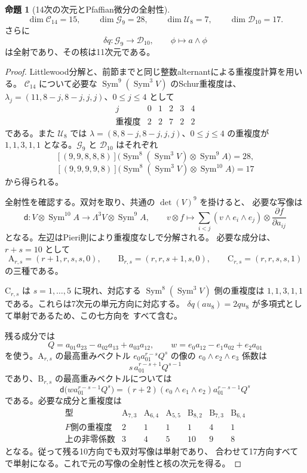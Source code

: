 \documentclass[a4paper,11pt]{ltjsarticle}
\theoremstyle{definition}
\newtheorem{proposition}[theorem]{命題}
\begin{document}
\begin{proposition}[14次の次元とPfaffian微分の全射性]
\label{prop:v11-fourteenth-characters}
\[
 \dim\mathcal C_{14}=15,\qquad
 \dim\mathcal G_9=28,\qquad
 \dim\mathcal U_8=7,\qquad
 \dim\mathcal D_{10}=17.
\]
さらに
\[
 \delta q:\mathcal G_9\longrightarrow\mathcal D_{10},
 \qquad \phi\longmapsto a\wedge\phi
\]
は全射であり、その核は11次元である。
\end{proposition}
\begin{proof}
Littlewood分解と、前節までと同じ整数alternantによる重複度計算を用いる。
$\mathcal C_{14}$ について必要な
$\operatorname{Sym}^9(\operatorname{Sym}^3V)$ のSchur重複度は、
$\lambda_j=(11,8-j,8-j,j,j)$、$0\le j\le4$ として
\[
\begin{array}{c|ccccc}
 j&0&1&2&3&4\\\hline
 \text{重複度}&2&2&7&2&2
\end{array}
\]
である。また $\mathcal U_8$ では
$\lambda=(8,8-j,8-j,j,j)$、$0\le j\le4$ の重複度が
$1,1,3,1,1$ となる。$\mathcal G_9$ と $\mathcal D_{10}$ はそれぞれ
\[
 [(9,9,8,8,8)]\bigl(
   \operatorname{Sym}^8(\operatorname{Sym}^3V)
   \otimes\operatorname{Sym}^{9}A\bigr)=28,
\]
\[
 [(9,9,9,9,8)]\bigl(
   \operatorname{Sym}^8(\operatorname{Sym}^3V)
   \otimes\operatorname{Sym}^{10}A\bigr)=17
\]
から得られる。

全射性を確認する。双対を取り、共通の $\det(V)^9$ を掛けると、
必要な写像は
\[
 \mathsf d:V\otimes\operatorname{Sym}^{10}A
       \longrightarrow\Lambda^3V\otimes\operatorname{Sym}^{9}A,
 \qquad
 v\otimes f\longmapsto
 \sum_{i<j}(v\wedge e_i\wedge e_j)\otimes
                         \frac{\partial f}{\partial a_{ij}}
\]
となる。左辺はPieri則により重複度なしで分解される。
必要な成分は、$r+s=10$ として
\[
 \mathrm A_{r,s}=(r+1,r,s,s,0),\qquad
 \mathrm B_{r,s}=(r,r,s+1,s,0),\qquad
 \mathrm C_{r,s}=(r,r,s,s,1)
\]
の三種である。

$\mathrm C_{r,s}$ は $s=1,\ldots,5$ に現れ、対応する
$\operatorname{Sym}^8(\operatorname{Sym}^3V)$ 側の重複度は
$1,1,3,1,1$ である。これらは7次元の単元方向に対応する。
$\delta q(a u_8)=2q u_8$ が多項式として単射であるため、この七方向を
すべて含む。

残る成分では
\[
 Q=a_{01}a_{23}-a_{02}a_{13}+a_{03}a_{12},\qquad
 w=e_0a_{12}-e_1a_{02}+e_2a_{01}
\]
を使う。$\mathrm A_{r,s}$ の最高重みベクトル
$e_0a_{01}^{r-s}Q^s$ の像の $e_0\wedge e_2\wedge e_3$ 係数は
\[
 s\,a_{01}^{r-s+1}Q^{s-1}
\]
であり、$\mathrm B_{r,s}$ の最高重みベクトルについては
\[
 \mathsf d\bigl(w a_{01}^{r-s-1}Q^s\bigr)
   =(r+2)(e_0\wedge e_1\wedge e_2)a_{01}^{r-s-1}Q^s
\]
である。必要な成分と重複度は
\[
\begin{array}{c|ccc|ccc}
 \text{型}&\mathrm A_{7,3}&\mathrm A_{6,4}&\mathrm A_{5,5}
           &\mathrm B_{8,2}&\mathrm B_{7,3}&\mathrm B_{6,4}\\\hline
 \text{$F$側の重複度}&2&1&1&1&4&1\\
 \text{上の非零係数}&3&4&5&10&9&8
\end{array}
\]
となる。従って残る10方向でも双対写像は単射であり、
合わせて17方向すべてで単射になる。これで元の写像の全射性と核の次元を得る。
\end{proof}
\end{document}

